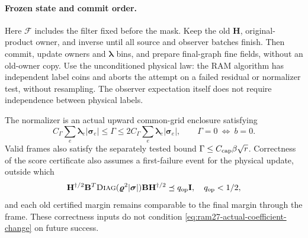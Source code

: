 \documentclass[11pt]{article}
\theoremstyle{remark}
\newcommand{\BB}{\mathbf B}
\newcommand{\II}{\mathbf I}
\newcommand{\HH}{\mathbf H}
\newcommand{\llambda}{\boldsymbol{\lambda}}
\newcommand{\vvr}{\boldsymbol{\varrho}}
\newcommand{\ssigma}{\boldsymbol{\sigma}}
\newcommand{\diag}{\textsc{Diag}}
\begin{document}
\paragraph{Frozen state and commit order.}
Here $\mathcal F$ includes the filter fixed before the mask.
Keep the old $\HH$, original-product owner, and inverse until all source and
observer batches finish.
Then commit, update owners and $\llambda$ bins, and prepare final-graph fine
fields, without an old-owner copy.
Use the unconditioned physical law: the RAM algorithm has independent label
coins and aborts the attempt on a failed residual or normalizer test, without
resampling.
The observer expectation itself does not require independence between physical
labels.

The normalizer is an actual upward common-grid enclosure satisfying
\begin{equation}\label{eq:ram27-gamma}
 C_\Gamma\sum_e\llambda_e|\ssigma_e|
 \le \Gamma\le 2C_\Gamma\sum_e\llambda_e|\ssigma_e|,
 \qquad \Gamma=0\ \Longleftrightarrow\ b=0 .
\end{equation}
Valid frames also satisfy the separately tested bound $\Gamma\le C_{\rm
cap}\beta\sqrt r$.
Correctness of the score certificate also assumes a first-failure event for the
physical update, outside which
\[
 \HH^{\dagger/2}\BB^T\diag(\vvr^2|\ssigma|)\BB\HH^{\dagger/2}
       \preceq q_{\rm op}\II,\quad q_{\rm op}<1/2,
\]
and each old certified margin remains comparable to the final margin through the
frame.
These correctness inputs do not condition
\eqref{eq:ram27-actual-coefficient-change} on future success.
\end{document}
